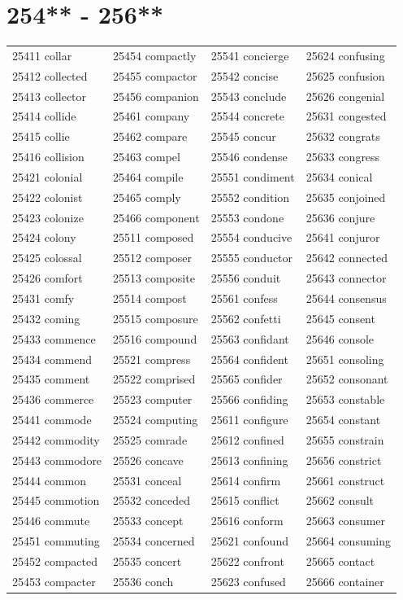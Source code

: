\documentclass[10pt, oneside]{book}
\begin{document}
\begin{table}
	\centering
	\section*{254** - 256**}
	\begin{tabular}{l l l l}
25411 collar &25454 compactly &25541 concierge &25624 confusing\\
25412 collected &25455 compactor &25542 concise &25625 confusion\\
25413 collector &25456 companion &25543 conclude &25626 congenial\\
25414 collide &25461 company &25544 concrete &25631 congested\\
25415 collie &25462 compare &25545 concur &25632 congrats\\
25416 collision &25463 compel &25546 condense &25633 congress\\
25421 colonial &25464 compile &25551 condiment &25634 conical\\
25422 colonist &25465 comply &25552 condition &25635 conjoined\\
25423 colonize &25466 component &25553 condone &25636 conjure\\
25424 colony &25511 composed &25554 conducive &25641 conjuror\\
25425 colossal &25512 composer &25555 conductor &25642 connected\\
25426 comfort &25513 composite &25556 conduit &25643 connector\\
25431 comfy &25514 compost &25561 confess &25644 consensus\\
25432 coming &25515 composure &25562 confetti &25645 consent\\
25433 commence &25516 compound &25563 confidant &25646 console\\
25434 commend &25521 compress &25564 confident &25651 consoling\\
25435 comment &25522 comprised &25565 confider &25652 consonant\\
25436 commerce &25523 computer &25566 confiding &25653 constable\\
25441 commode &25524 computing &25611 configure &25654 constant\\
25442 commodity &25525 comrade &25612 confined &25655 constrain\\
25443 commodore &25526 concave &25613 confining &25656 constrict\\
25444 common &25531 conceal &25614 confirm &25661 construct\\
25445 commotion &25532 conceded &25615 conflict &25662 consult\\
25446 commute &25533 concept &25616 conform &25663 consumer\\
25451 commuting &25534 concerned &25621 confound &25664 consuming\\
25452 compacted &25535 concert &25622 confront &25665 contact\\
25453 compacter &25536 conch &25623 confused &25666 container\\
	\end{tabular}
 \end{table}
\clearpage
\end{document}
